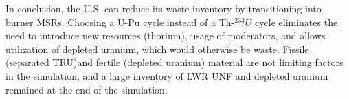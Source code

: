 In conclusion, the U.S. can reduce its waste inventory by transitioning into
burner \glspl{MSR}. Choosing a U-Pu cycle instead of a Th-$^{233}U$ cycle
eliminates the need to introduce new resources (thorium), usage of moderators,
and allows utilization of depleted uranium, which would otherwise be waste.
Fissile (separated \gls{TRU})and fertile (depleted uranium) material are
not limiting factors in the simulation, and a large inventory of \gls{LWR} \gls{UNF}
and depleted uranium remained at the end of the simulation.